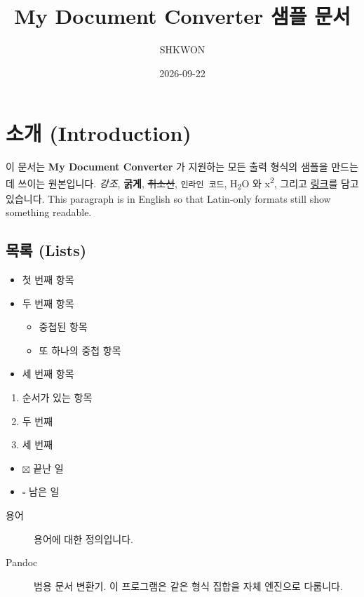 \documentclass[11pt]{article}
\title{My Document Converter 샘플 문서}
\author{SHKWON}
\date{2026-09-22}
\begin{document}
\maketitle

\section*{소개 (Introduction)}\label{소개-introduction}

이 문서는 \textbf{My Document Converter} 가 지원하는 모든 출력 형식의 샘플을 만드는 데 쓰이는
원본입니다.
\emph{강조}, \textbf{굵게}, \sout{취소선}, \verb|인라인 코드|, H\textsubscript{2}O 와
x\textsuperscript{2}, 그리고 \href{https://example.com}{링크}를 담고 있습니다.
This paragraph is in English so that Latin-only formats still show
something readable.

\subsection*{목록 (Lists)}\label{목록-lists}

\begin{itemize}
\item 첫 번째 항목
\item 두 번째 항목
\begin{itemize}
\item 중첩된 항목
\item 또 하나의 중첩 항목
\end{itemize}
\item 세 번째 항목
\end{itemize}

\begin{enumerate}
\item 순서가 있는 항목
\item 두 번째
\item 세 번째
\end{enumerate}

\begin{itemize}
\item $\boxtimes$ 끝난 일
\item $\square$ 남은 일
\end{itemize}

\begin{description}
\item[용어] 용어에 대한 정의입니다.
\item[Pandoc] 범용 문서 변환기. 이 프로그램은 같은 형식 집합을 자체 엔진으로 다룹니다.
\end{description}
\end{document}
